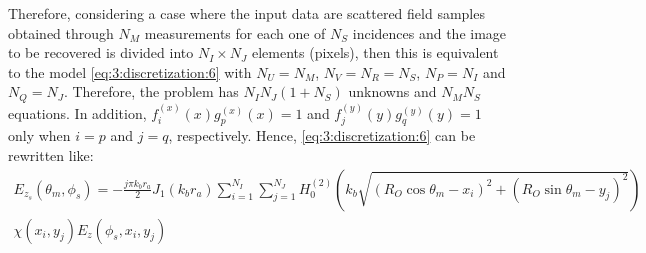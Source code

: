 			Therefore, considering a case where the input data are scattered field samples obtained through $N_M$ measurements for each one of $N_S$ incidences and the image to be recovered is divided into $N_I\times N_J$ elements (pixels), then this is equivalent to the model \eqref{eq:3:discretization:6} with $N_U = N_M$, $N_V = N_R = N_S$, $N_P = N_I$ and $N_Q = N_J$. Therefore, the problem has $N_IN_J(1+N_S)$ unknowns and $N_MN_S$ equations. In addition, $f^{(x)}_i(x)g^{(x)}_p(x)=1$ and $f^{(y)}_j(y)g^{(y)}_q(y)=1$ only when $i=p$ and $j=q$, respectively. Hence, \eqref{eq:3:discretization:6} can be rewritten like:
			\begin{multline}
				E_{z_s}(\theta_m,\phi_s) = - \frac{j\pi k_b r_a}{2} J_1(k_br_a) \sum\limits_{i=1}^{N_I}\sum\limits_{j=1}^{N_J} H^{(2)}_0(k_b\sqrt{(R_O\cos\theta_m-x_i)^2+(R_O\sin\theta_m-y_j)^2}) \\ \chi(x_i,y_j) E_z(\phi_s,x_i,y_j) \label{eq:3:discretization:collocation:2}
			\end{multline}
		
